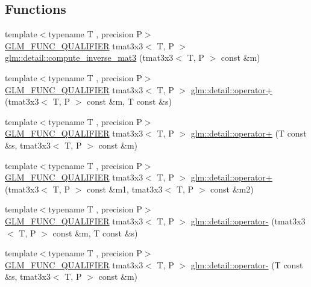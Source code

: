 \subsection*{Functions}
\begin{DoxyCompactItemize}
\item 
{\footnotesize template$<$typename T , precision P$>$ }\\\hyperlink{setup_8hpp_a33fdea6f91c5f834105f7415e2a64407}{G\+L\+M\+\_\+\+F\+U\+N\+C\+\_\+\+Q\+U\+A\+L\+I\+F\+I\+ER} tmat3x3$<$ T, P $>$ \hyperlink{namespaceglm_1_1detail_aa948376cf64483b85ce05e2a3da5af7d}{glm\+::detail\+::compute\+\_\+inverse\+\_\+mat3} (tmat3x3$<$ T, P $>$ const \&m)
\item 
{\footnotesize template$<$typename T , precision P$>$ }\\\hyperlink{setup_8hpp_a33fdea6f91c5f834105f7415e2a64407}{G\+L\+M\+\_\+\+F\+U\+N\+C\+\_\+\+Q\+U\+A\+L\+I\+F\+I\+ER} tmat3x3$<$ T, P $>$ \hyperlink{namespaceglm_1_1detail_a8cd5025c3c0f1ecd8483a1ffe964dc99}{glm\+::detail\+::operator+} (tmat3x3$<$ T, P $>$ const \&m, T const \&s)
\item 
{\footnotesize template$<$typename T , precision P$>$ }\\\hyperlink{setup_8hpp_a33fdea6f91c5f834105f7415e2a64407}{G\+L\+M\+\_\+\+F\+U\+N\+C\+\_\+\+Q\+U\+A\+L\+I\+F\+I\+ER} tmat3x3$<$ T, P $>$ \hyperlink{namespaceglm_1_1detail_a3f3a43e8b4fd66a95bf59e7bdee3ce56}{glm\+::detail\+::operator+} (T const \&s, tmat3x3$<$ T, P $>$ const \&m)
\item 
{\footnotesize template$<$typename T , precision P$>$ }\\\hyperlink{setup_8hpp_a33fdea6f91c5f834105f7415e2a64407}{G\+L\+M\+\_\+\+F\+U\+N\+C\+\_\+\+Q\+U\+A\+L\+I\+F\+I\+ER} tmat3x3$<$ T, P $>$ \hyperlink{namespaceglm_1_1detail_a1de7b8d0a9cd0ef41c6775f0ad5dc50b}{glm\+::detail\+::operator+} (tmat3x3$<$ T, P $>$ const \&m1, tmat3x3$<$ T, P $>$ const \&m2)
\item 
{\footnotesize template$<$typename T , precision P$>$ }\\\hyperlink{setup_8hpp_a33fdea6f91c5f834105f7415e2a64407}{G\+L\+M\+\_\+\+F\+U\+N\+C\+\_\+\+Q\+U\+A\+L\+I\+F\+I\+ER} tmat3x3$<$ T, P $>$ \hyperlink{namespaceglm_1_1detail_a993dc86809520a77ebe199a9a5356104}{glm\+::detail\+::operator-\/} (tmat3x3$<$ T, P $>$ const \&m, T const \&s)
\item 
{\footnotesize template$<$typename T , precision P$>$ }\\\hyperlink{setup_8hpp_a33fdea6f91c5f834105f7415e2a64407}{G\+L\+M\+\_\+\+F\+U\+N\+C\+\_\+\+Q\+U\+A\+L\+I\+F\+I\+ER} tmat3x3$<$ T, P $>$ \hyperlink{namespaceglm_1_1detail_a5349b29e890372630bf5bfadf784f688}{glm\+::detail\+::operator-\/} (T const \&s, tmat3x3$<$ T, P $>$ const \&m)

\end{DoxyCompactItemize}
